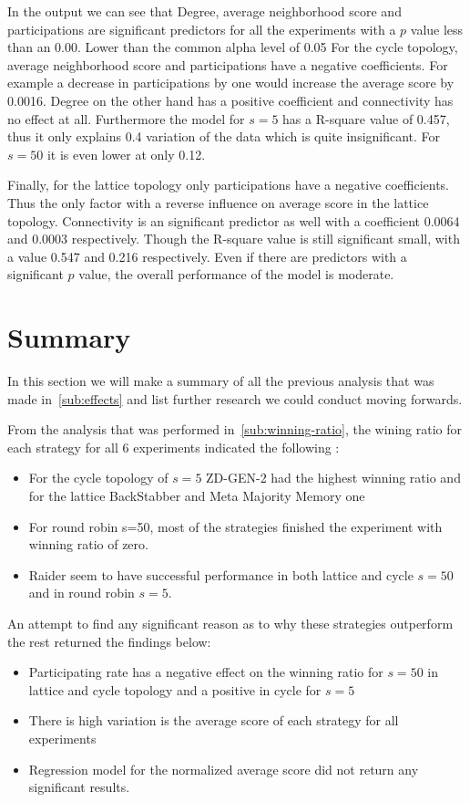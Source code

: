 In the output we can see that Degree, average neighborhood score and participations
are significant predictors for all the experiments with a \(p\) value less than an 0.00.
Lower than the common alpha level of 0.05
For the cycle topology, average neighborhood score and participations have a negative
coefficients. For example a decrease in participations by one would increase
the average score by 0.0016. Degree on the other hand has a positive coefficient
and connectivity has no effect at all. Furthermore the model for \(s=5\) has
a R-square value of 0.457, thus it only explains 0.4 variation of the data which is
quite insignificant. For \(s=50\) it is even lower at only 0.12.

Finally, for the lattice topology only participations have a negative coefficients.
Thus the only factor with a reverse influence on average score in the lattice topology.
Connectivity is an significant predictor as well with a coefficient 0.0064 and
0.0003 respectively. Though the R-square value is still significant small,
with a value 0.547 and 0.216 respectively.
Even if there are predictors with a significant \(p\) value, the overall
performance of the model is moderate.


\section{Summary}

In this section we will make a summary of all the previous analysis that was made
in~\ref{sub:effects} and list further research we could conduct moving forwards.

From the analysis that was performed in~\ref{sub:winning-ratio}, the wining ratio
for each strategy for all 6 experiments indicated the following :
\begin{itemize}
  \item For the cycle topology of \(s=5\) ZD-GEN-2 had the highest winning ratio
        and for the lattice BackStabber and Meta Majority Memory one
  \item For round robin s=50, most of the strategies finished the experiment
        with winning ratio of zero.
  \item Raider seem to have successful performance in both lattice and cycle \(s=50\)
        and in round robin \(s=5\).
\end{itemize}

An attempt to find any significant reason as to why these strategies outperform
the rest returned the findings below:
\begin{itemize}
  \item Participating rate has a negative effect on the winning ratio for \(s=50\)
        in lattice and cycle topology and a positive in cycle for \(s=5\)
  \item There is high variation is the average score of each strategy for all
        experiments
  \item Regression model for the normalized average score did not return any
        significant results.
\end{itemize}

